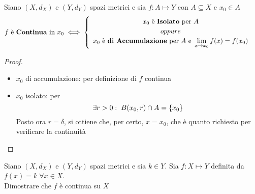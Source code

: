 \begin{proposition}
	\label{prop:f_cont_se_isol_o_accum}
	Siano $(X,d_X)$ e $(Y,d_Y)$ spazi metrici e sia $f: A \mapsto Y$ con $A \subseteq X$ e $x_0 \in A$
	\begin{equation*}
		f \text{ è \textbf{Continua} in } x_0 \iff
		\begin{cases}
			\begin{array}{c}
				x_0 \text{ è \textbf{Isolato} per } A\\
				oppure\\
				x_0 \text{ è \textbf{di Accumulazione} per } A \text{ e } \lim\limits_{x \to x_0} f(x) = f(x_0)
			\end{array}
		\end{cases}
	\end{equation*}
	\begin{proof}~
		\begin{itemize}
			\item $x_0$ di accumulazione: per definizione di $f$ continua
			\item $x_0$ isolato: per 
				\[\exists r > 0:\; B(x_0, r) \cap A = \left\{x_0\right\}\]
				Posto ora $r = \delta$, si ottiene che, per certo, $x = x_0$, che è quanto richiesto per verificare la continuità
		\end{itemize}
	\end{proof}
\end{proposition}
\begin{exercise}
	Siano $(X,d_X)$ e $(Y,d_Y)$ spazi metrici e sia $k \in Y$. Sia $f:X \mapsto Y$ definita da $f(x) = k \; \forall x \in X$.\\
	Dimostrare che $f$ è continua su $X$
\end{exercise}

